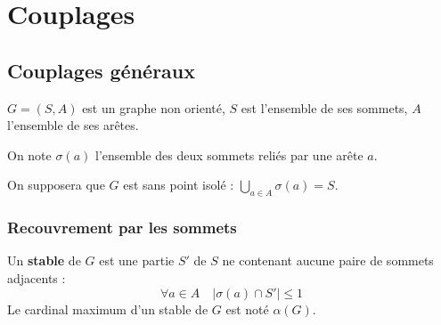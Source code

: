 \chapter{Couplages}
\thispagestyle{empty}
\section{Couplages généraux}

$G=(S,A)$ est un graphe non orienté, $S$ est l'ensemble de ses sommets, $A$ l'ensemble de ses arêtes.

On note $\sigma(a)$ l'ensemble des deux sommets reliés par une arête $a$.

On supposera que $G$ est sans point isolé : $\displaystyle \bigcup_{a \in A} \sigma(a)=S$.
\subsection{Recouvrement par les sommets}
Un {\bf stable} de $G$ est une partie $S'$ de $S$ ne contenant aucune paire de sommets adjacents : 
\[\forall a\in A\quad |\sigma(a)\cap S'| \le 1\]
Le cardinal maximum d'un stable de $G$ est noté $\alpha(G)$.

\smallskip

